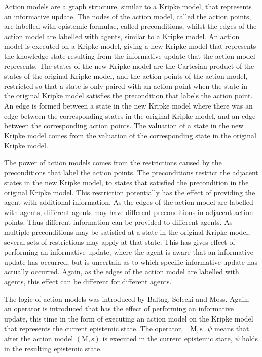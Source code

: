 Action models are a graph structure, similar to a Kripke model, that represents
an informative update. The nodes of the action model, called the action points,
are labelled with epistemic formulae, called preconditions, whilst the edges of
the action model are labelled with agents, similar to a Kripke model. An action
model is executed on a Kripke model, giving a new Kripke model that represents
the knowledge state resulting from the informative update that the action model
represents. The states of the new Kripke model are the Cartesian product of the
states of the original Kripke model, and the action points of the action model,
restricted so that a state is only paired with an action point when the state in
the original Kripke model satisfies the precondition that labels the action
point. An edge is formed between a state in the new Kripke model where there was
an edge between the corresponding states in the original Kripke model, and an
edge between the corresponding action points. The valuation of a state in the
new Kripke model comes from the valuation of the corresponding state in the
original Kripke model.

The power of action models comes from the restrictions caused by the
preconditions that label the action points. The preconditions restrict the
adjacent states in the new Kripke model, to states that satisfied the
precondition in the original Kripke model. This restriction potentially has the
effect of providing the agent with additional information.  As the edges of the
action model are labelled with agents, different agents may have different
preconditions in adjacent action points. Thus different information can be
provided to different agents. As multiple preconditions may be satisfied at a
state in the original Kripke model, several sets of restrictions may apply at
that state. This has gives effect of performing an informative update, where the
agent is aware that an informative update has occurred, but is uncertain as to
which specific informative update has actually occurred. Again, as the edges of
the action model are labelled with agents, this effect can be different for
different agents.

The logic of action models was introduced by Baltag, Solecki and
Moss\cite{baltag2004logics}. Again, an operator is introduced that has the
effect of performing an informative update, this time in the form of executing
an action model on the Kripke model that represents the current epistemic
state.  The operator, $[\mathrm{M,s}]\psi$ means that after the action model
$(\mathrm{M, s})$ is executed in the current epistemic state, $\psi$ holds in
the resulting epistemic state. 

